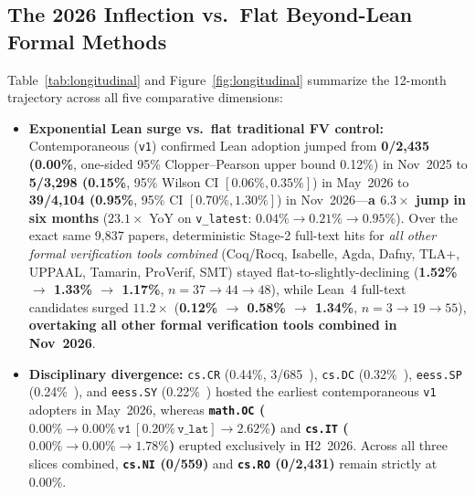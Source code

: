 \documentclass[11pt,letterpaper]{article}
\begin{document}
\subsection{The 2026 Inflection vs.\ Flat Beyond-Lean Formal Methods}
Table~\ref{tab:longitudinal} and Figure~\ref{fig:longitudinal} summarize the 12-month trajectory across all five comparative dimensions:
\begin{itemize}
  \item \textbf{Exponential Lean surge vs.\ flat traditional FV control:} Contemporaneous (\texttt{v1}) confirmed Lean adoption jumped from \textbf{0/2,435 (0.00\%}, one-sided 95\% Clopper--Pearson upper bound 0.12\%) in Nov~2025 to \textbf{5/3,298 (0.15\%}, 95\% Wilson CI $[0.06\%, 0.35\%]$) in May~2026 to \textbf{39/4,104 (0.95\%}, 95\% CI $[0.70\%, 1.30\%]$) in Nov~2026---\textbf{a $6.3\times$ jump in six months} ($23.1\times$ YoY on \texttt{v\_latest}: $0.04\% \rightarrow 0.21\% \rightarrow 0.95\%$). Over the exact same 9,837 papers, deterministic Stage-2 full-text hits for \emph{all other formal verification tools combined} (Coq/Rocq, Isabelle, Agda, Dafny, TLA+, UPPAAL, Tamarin, ProVerif, SMT) stayed flat-to-slightly-declining (\textbf{1.52\% $\rightarrow$ 1.33\% $\rightarrow$ 1.17\%}, $n=37 \rightarrow 44 \rightarrow 48$), while Lean~4 full-text candidates surged $11.2\times$ (\textbf{0.12\% $\rightarrow$ 0.58\% $\rightarrow$ 1.34\%}, $n=3 \rightarrow 19 \rightarrow 55$), \textbf{overtaking all other formal verification tools combined in Nov~2026}.
  \item \textbf{Disciplinary divergence:} \texttt{cs.CR} (0.44\%, 3/685~\cite{arxiv2605_02856,arxiv2605_03034,arxiv2605_16407}), \texttt{cs.DC} (0.32\%~\cite{arxiv2605_05801}), \texttt{eess.SP} (0.24\%~\cite{arxiv2605_14610}), and \texttt{eess.SY} (0.22\%~\cite{arxiv2605_03034}) hosted the earliest contemporaneous \texttt{v1} adopters in May~2026, whereas \textbf{\texttt{math.OC} ($0.00\% \rightarrow 0.00\%\,\texttt{v1}\,[0.20\%\,\texttt{v\_lat}] \rightarrow 2.62\%$)} and \textbf{\texttt{cs.IT} ($0.00\% \rightarrow 0.00\% \rightarrow 1.78\%$)} erupted exclusively in H2~2026. Across all three slices combined, \textbf{\texttt{cs.NI} (0/559)} and \textbf{\texttt{cs.RO} (0/2,431)} remain strictly at 0.00\%.

\end{itemize}
\end{document}
